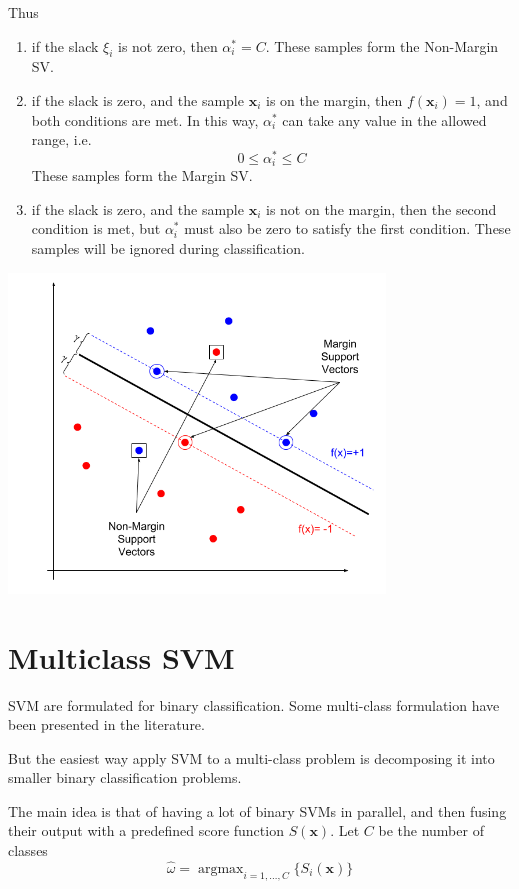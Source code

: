 \documentclass[oneside,onecolumn]{report}
\DeclareMathOperator*{\argmax}{argmax}
\begin{document}
Thus
\begin{enumerate}
    \item if the slack $\xi_i$ is not zero, then $\alpha_i^* = C$. These samples form the Non-Margin SV.
    \item if the slack is zero, and the sample $\bm x_i$ is on the margin, then $f(\bm x_i) = 1$, and both conditions are met. In this way, $\alpha_i^*$ can take any value in the allowed range, i.e.
    $$ 0 \leq \alpha_i^* \leq C $$
    These samples form the Margin SV.
    \item if the slack is zero, and the sample $\bm x_i$ is not on the margin, then the second condition is met, but $\alpha_i^*$ must also be zero to satisfy the first condition.
    These samples will be ignored during classification.
\end{enumerate}

\begin{center}
    \includegraphics[width=10cm]{support_vectors_1-NSMC.png}
\end{center}

\section{Multiclass SVM}
SVM are formulated for binary classification.
Some multi-class formulation have been presented in the literature.

But the easiest way apply SVM to a multi-class problem is decomposing it into smaller binary classification problems.

The main idea is that of having a lot of binary SVMs in parallel, and then fusing their output with a predefined score function $S(\bm x)$.
Let $C$ be the number of classes
$$ \widehat \omega = \argmax_{i = 1, \dots, C} \{S_i(\bm x)\} $$
\end{document}
